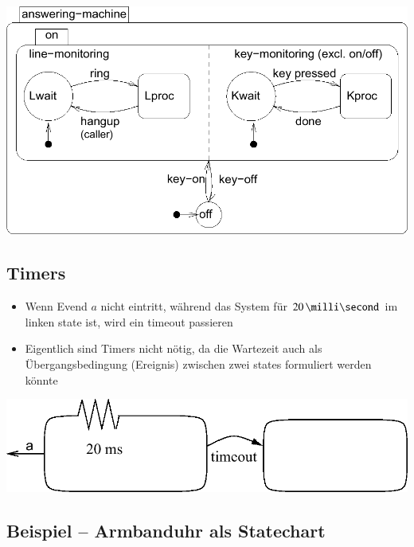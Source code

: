 \begin{center}
    \includegraphics[width=0.75\columnwidth]{images/statechart_concurrency.png}
\end{center}


\subsection{Timers}

\begin{itemize}
    \item Wenn Evend $a$ nicht eintritt, während das System für $20 \, \milli \second$ im linken state ist, wird ein timeout passieren
    \item Eigentlich sind Timers nicht nötig, da die Wartezeit auch als Übergangsbedingung (Ereignis) zwischen zwei states formuliert werden könnte
\end{itemize}

\begin{center}
    \includegraphics[width=0.65\columnwidth]{images/statechart_timers.png}
\end{center}


\subsection{Beispiel -- Armbanduhr als Statechart}

